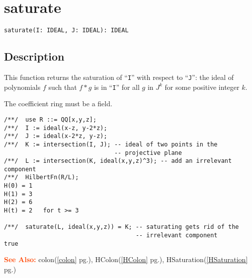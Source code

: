 \documentclass[a4paper]{mybook}
\newenvironment{command}{}{} %
\newcommand\SeeAlso{\par\textcolor{OrangeRed}{\textbf{\large See Also: }}}
\begin{document}
\section{saturate}
\label{saturate}
\begin{command} %


\begin{Verbatim}[label=syntax, rulecolor=\color{MidnightBlue},
frame=single]
saturate(I: IDEAL, J: IDEAL): IDEAL
\end{Verbatim}


\subsection*{Description}

This function returns the saturation of ``\verb&I&'' with respect to ``\verb&J&'': the
ideal of polynomials $f$ such that $f*g$ is in ``\verb&I&'' for all $g$ in $J^k$
for some positive integer $k$.
\par 
The coefficient ring must be a field.
\begin{Verbatim}[label=example, rulecolor=\color{PineGreen}, frame=single]
/**/  use R ::= QQ[x,y,z];
/**/  I := ideal(x-z, y-2*z);
/**/  J := ideal(x-2*z, y-z);
/**/  K := intersection(I, J); -- ideal of two points in the
                               -- projective plane
/**/  L := intersection(K, ideal(x,y,z)^3); -- add an irrelevant component
/**/  HilbertFn(R/L);
H(0) = 1
H(1) = 3
H(2) = 6
H(t) = 2   for t >= 3

/**/  saturate(L, ideal(x,y,z)) = K; -- saturating gets rid of the
                                     -- irrelevant component
true
\end{Verbatim}


\SeeAlso %
  colon(\ref{colon} pg.\pageref{colon}), 
    HColon(\ref{HColon} pg.\pageref{HColon}), 
    HSaturation(\ref{HSaturation} pg.\pageref{HSaturation})
\end{command} %
\end{document}
